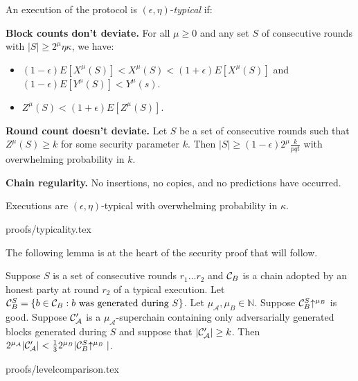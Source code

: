 \begin{definition} %
    An execution of the protocol is $(\epsilon, \eta)$-\textit{typical} if:

    \textnormal{\bf Block counts don't deviate.}
    For all $\mu \geq 0$ and any set $S$ of consecutive rounds
    with $|S| \geq 2^\mu \eta\kappa$, we have:

    \begin{itemize}
        \item $(1 - \epsilon)E[X^\mu(S)] < X^\mu(S) < (1 + \epsilon)E[X^\mu(S)]$ and $(1 - \epsilon)E[Y^\mu(S)] < Y^\mu(s)$.
        \item $Z^\mu(S) < (1 + \epsilon)E[Z^\mu(S)]$.
    \end{itemize}

    \textnormal{\bf Round count doesn't deviate.}
    Let $S$ be a set of consecutive rounds such that $Z^\mu(S)
    \geq k$ for some security parameter $k$. Then $|S| \geq (1 -
    \epsilon)2^\mu\frac{k}{pqt}$ with overwhelming probability in $k$.

    \textnormal{\bf Chain regularity.}
    No insertions, no copies, and no predictions \cite{backbone} have occurred.
\end{definition}

\begin{theorem}[Typicality]
\label{thm.typicality}
Executions are $(\epsilon, \eta)$-typical with overwhelming
probability in $\kappa$.
\end{theorem}
{proofs/typicality.tex}

The following lemma is at the heart of the security proof that will follow.

\begin{lemma}\label{lem.level-comparison}
    Suppose $S$ is a set of consecutive rounds $r_1 \ldots r_2$
    and $\mathcal{C}_B$ is
    a chain adopted by an honest party at round $r_2$ of a typical execution.
    Let $\mathcal{C}_B^S = \{b \in
    \mathcal{C}_B: b \textnormal{ was generated during } S\}$. Let $\mu_\mathcal{A},
    \mu_B \in \mathbb{N}$. Suppose $\mathcal{C}_B^S\negthickspace\uparrow^{\mu_B}$ is good.
    Suppose $\mathcal{C}'_\mathcal{A}$ is a $\mu_\mathcal{A}$-superchain containing
    only adversarially generated blocks generated during $S$ and suppose that
    $|\mathcal{C}'_\mathcal{A}| \geq k$.
    Then
    $2^{\mu_\mathcal{A}}|\mathcal{C}'_\mathcal{A}| < \frac{1}{3}2^{\mu_B}|\mathcal{C}_B^S\negthickspace\uparrow^{\mu_B}|$.
\end{lemma}
{proofs/levelcomparison.tex}

